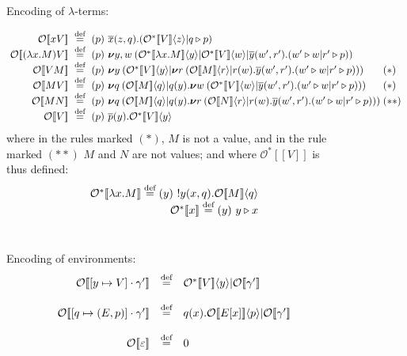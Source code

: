 \documentclass[11pt,a4paper]{amsart}
\theoremstyle{plain}
\theoremstyle{definition}
\theoremstyle{defC}
\theoremstyle{thmC}
\theoremstyle{plain}
\numberwithin{equation}{section}
\def\finish#1{\vskip.2cm\noindent{\em #1}%
  \marginpar{$\longleftarrow$}\vskip.2cm}
\newcommand{\finish}[1]{}
\newcommand{\obj}[1]{\langle #1 \rangle}
\def\nil{0}
\def\res#1{{\boldsymbol \nu} #1\:}   %
\def\inp#1#2{#1(#2)}
\def\bout#1#2{\overline{#1}(#2)}   %
\newcommand{\outb}{\bout}           %
\newcommand{\new}{\res}           %
\def\app#1#2{#1\obj{#2}}                    %
\def\defi{\stackrel{\mbox{\scriptsize {\rm{def}}}}{=}} %
\def\Mybar{{\center \rule{\hsize}{0.5mm}}} %
\def\Mybar{}
\newcommand{\cbvSymb}{{\mathcal {V}}}
\newcommand{\enca}[1]{\cbvSymb[\![#1]\!]}
\newcommand{\encoEnvV}[1]{{\mathcal {O}} [\! [ #1 ] \! ]  } %
\newcommand{\bind}[1]{({#1})~}
\newcommand{\encoV}[1]{{\mathcal O}[\![#1]\!]}  %
\newcommand{\encoVa}[2]{\app{\encoV{#1} }{#2}} %
\newcommand{\encoVVa}[2]{\app{\encoVV{#1}}{#2}}  %
\newcommand{\encoVV}[1]{{\mathcal O}^\variant[\![#1]\!]} %
\newcommand{\variant}{*} %
\newcommand{\equaDS}[4]{ #2& #3& #4&  \mbox{{$#1 $}}}
\newcommand{\val}{V}
\newcommand{\fwdsymb}{\triangleright}
\newcommand{\fwd}[2]{#1\fwdsymb #2}
\newcommand{\mypt}{12pt}
\newcommand{\emptymap}{\varepsilon}
\newcommand{\pmap}[2]{[#1 \mapsto #2]}
\theoremstyle{plain}
\theoremstyle{definition}
\begin{document}

\begin{figure}
\Mybar 
{\small
Encoding of  $\lambda$-terms:

\[
\setlength{\arraycolsep}{3pt}%
\begin{array}{rcl@{\;}l}
\equaDS{}
{  \encoV {x\val}} \defi{ \bind p \outb x {z,q}.(\encoVVa \val z|\fwd q p)}
\\
\equaDS{}
{ \encoV {(\lambda  x.  M)\val}} \defi{ \bind p \new {y,w} (\encoVVa {\lambda  x. M} y | \encoVVa {\val} w
  | \outb y {w',r'}.(\fwd {w'} w|\fwd {r'} p))} 
\\
\equaDS{{(*)}}
{ \encoV {\val M}} \defi{ \bind p \new y (\encoVVa \val y | \new r (\encoVa M r | \inp r w
  .\outb y {w',r'}.(\fwd {w'} w|\fwd {r'} p)))}
\\
\equaDS{{(*)}}
{ \encoV {M\val} } \defi {\bind p \new q (\encoVa M q | \inp q y. \new w (\encoVVa \val w |
  \outb y {w',r'}.(\fwd {w'} w|\fwd {r'} p)))}
\\
\equaDS{{(**)}}
{ \encoV {MN}} \defi {\bind p \new q (\encoVa M q | \inp q y. \new r (\encoVa N r | \inp r w
  .\outb y {w',r'}.(\fwd {w'} w|\fwd {r'} p)))}
\\
\equaDS{}
{ \encoV {\val}}\defi{ \bind p \outb p y . \encoVVa\val y}
\end{array} 
  \]
where
in the  rules marked $(*)$, $M$ is  not   a value,  and  
in the rule marked $(**)$   $M$ and $N$  are  not values;
and where 
 $ \encoVV\val$ is thus defined:
\[
\begin{array}{rcl}
\encoVV {\lambda  x. M}\defi{ \bind y  !\inp y {x,q}.\encoVa M q}\\
\encoVV x \defi {\bind y \fwd y x}
\end{array}
\]
$ $ \dotfill $ $ 


Encoding of environments: 
\[ 
\begin{array}{rcl}
\encoEnvV{\pmap{y}{V}\cdot\gamma'  } & \defi & \encoVVa {V} y | \encoEnvV{\gamma'  }
\\[\mypt] 
\encoEnvV{\pmap{q}{(E,p)}\cdot\gamma'  } & \defi & 
\inp qx .\encoVa {E[x]} p  | \encoEnvV{\gamma'  } \\[\mypt]
\encoEnvV{\emptymap  } & \defi & \nil
\end{array} 
\]
$ $ \dotfill $ $ 

}
\end{figure}
\end{document}
